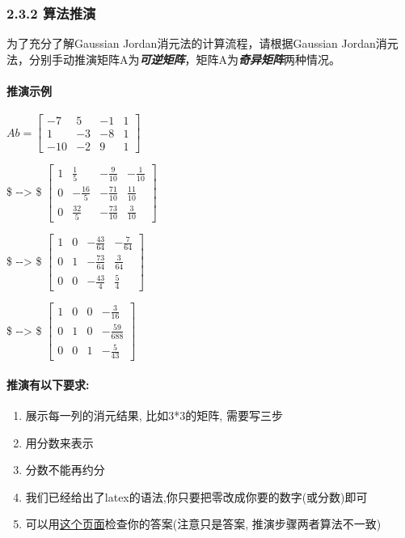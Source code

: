 \documentclass[11pt]{article}
\providecommand{\tightlist}{%
      \setlength{\itemsep}{0pt}\setlength{\parskip}{0pt}}
\begin{document}
    \subsubsection{2.3.2 算法推演}\label{ux7b97ux6cd5ux63a8ux6f14}

为了充分了解Gaussian Jordan消元法的计算流程，请根据Gaussian
Jordan消元法，分别手动推演矩阵A为\textbf{\emph{可逆矩阵}}，矩阵A为\textbf{\emph{奇异矩阵}}两种情况。

    \paragraph{推演示例}\label{ux63a8ux6f14ux793aux4f8b}

\(Ab = \begin{bmatrix}  -7 & 5 & -1 & 1\\  1 & -3 & -8 & 1\\  -10 & -2 & 9 & 1\end{bmatrix}\)

\$ -\/-\textgreater{} \$
\(\begin{bmatrix}  1 & \frac{1}{5} & -\frac{9}{10} & -\frac{1}{10}\\  0 & -\frac{16}{5} & -\frac{71}{10} & \frac{11}{10}\\  0 & \frac{32}{5} & -\frac{73}{10} & \frac{3}{10}\end{bmatrix}\)

\$ -\/-\textgreater{} \$
\(\begin{bmatrix}  1 & 0 & -\frac{43}{64} & -\frac{7}{64}\\  0 & 1 & -\frac{73}{64} & \frac{3}{64}\\  0 & 0 & -\frac{43}{4} & \frac{5}{4}\end{bmatrix}\)

\$ -\/-\textgreater{} \$
\(\begin{bmatrix}  1 & 0 & 0 & -\frac{3}{16}\\  0 & 1 & 0 & -\frac{59}{688}\\  0 & 0 & 1 & -\frac{5}{43}\end{bmatrix}\)

\paragraph{推演有以下要求:}\label{ux63a8ux6f14ux6709ux4ee5ux4e0bux8981ux6c42}

\begin{enumerate}
\def\labelenumi{\arabic{enumi}.}
\tightlist
\item
  展示每一列的消元结果, 比如3*3的矩阵, 需要写三步
\item
  用分数来表示
\item
  分数不能再约分
\item
  我们已经给出了latex的语法,你只要把零改成你要的数字(或分数)即可
\item
  可以用\href{http://www.math.odu.edu/~bogacki/cgi-bin/lat.cgi?c=sys}{这个页面}检查你的答案(注意只是答案,
  推演步骤两者算法不一致)
\end{enumerate}
\end{document}
